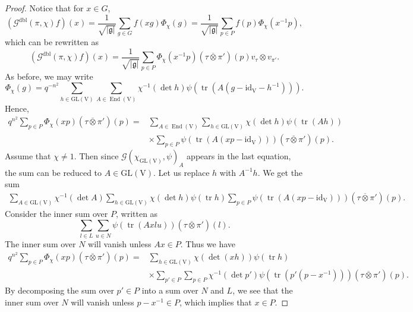 \documentclass[12pt, reqno]{amsart}
\theoremstyle{definition}
\theoremstyle{definition}
\theoremstyle{definition}
\newcommand{\EndomorphismRing}{\operatorname{End}}
\newcommand{\idmap}{\mathrm{id}}
\newcommand{\sizeof}[1]{\left|#1\right|}
\newcommand{\hermitianSpace}{\mathrm{V}}
\newcommand{\fieldCharacter}{\psi}
\newcommand{\trace}{\operatorname{tr}}
\newcommand{\GL}{\mathrm{GL}}
\newcommand{\GaussSum}[2]{\mathcal{G}\left(#1, #2\right)}
\newcommand{\dblGaussSum}[2]{\mathcal{G}^{\mathrm{dbl}}\left(#1, #2\right)}
\newcommand{\lieAlgebra}{\mathfrak{g}}
\begin{document}
\begin{proof}
	Notice that for $x \in G$, $$\left(\dblGaussSum{\pi}{\chi} f\right)\left(x\right) = \frac{1}{\sqrt{\sizeof{\lieAlgebra}}} \sum_{g \in G} f\left(xg\right) \Phi_{\chi}\left(g\right) = \frac{1}{\sqrt{\sizeof{\lieAlgebra}}} \sum_{p \in P} f\left(p\right) \Phi_{\chi}\left(x^{-1} p\right),$$
	which can be rewritten as
	$$\left(\dblGaussSum{\pi}{\chi} f\right)\left(x\right) = \frac{1}{\sqrt{\sizeof{\lieAlgebra}}} \sum_{p \in P}  \Phi_{\chi}\left(x^{-1} p\right) \left(\tau \overline{\otimes} \pi'\right)\left(p\right) v_\tau \otimes v_{\pi'}.$$
	As before, we may write
	$$\Phi_{\chi}\left(g\right) = q^{-n^2} \sum_{h \in \GL\left(\hermitianSpace\right)} \sum_{A \in \EndomorphismRing\left(\hermitianSpace\right)} \chi^{-1}\left(\det h\right) \fieldCharacter\left(\trace\left(A \left(g - \idmap_{\hermitianSpace} - h^{-1}\right)\right)\right).$$
	Hence, \begin{align*}
		q^{n^2} \sum_{p \in P} \Phi_{\chi}\left(xp\right) \left(\tau \overline{\otimes} \pi'\right)\left(p\right) =& \sum_{A \in \EndomorphismRing\left(\hermitianSpace\right)} \sum_{h \in \GL\left(\hermitianSpace\right)} \chi\left(\det h\right)\fieldCharacter\left(\trace\left(Ah\right)\right) \\
		& \times \sum_{p \in P} \fieldCharacter\left(\trace\left(A \left(xp - \idmap_{\hermitianSpace}\right)\right)\right) \left(\tau \overline{\otimes} \pi'\right)\left(p\right).
	\end{align*}
	Assume that $\chi \ne 1$. Then since $\GaussSum{\chi_{\GL\left(\hermitianSpace\right)}}{\fieldCharacter}_A$ appears in the last equation, the sum can be reduced to $A \in \GL\left(\hermitianSpace\right)$. Let us replace $h$ with $A^{-1} h$. We get the sum
	\begin{align*}
		\sum_{A \in \GL\left(\hermitianSpace\right)} \chi^{-1}\left(\det A\right) \sum_{h \in \GL\left(\hermitianSpace\right)} \chi\left(\det h\right)\fieldCharacter\left(\trace h\right) \sum_{p \in P} \fieldCharacter\left(\trace\left(A \left(xp - \idmap_{\hermitianSpace}\right)\right)\right) \left(\tau \overline{\otimes} \pi'\right)\left(p\right).
	\end{align*}
	Consider the inner sum over $P$, written as $$\sum_{l \in L} \sum_{u \in N} \fieldCharacter\left(\trace\left(A x l u\right)\right) \left(\tau \overline{\otimes} \pi'\right)\left(l\right).$$
	The inner sum over $N$ will vanish unless $Ax \in P$. Thus we have
	\begin{align*}
		q^{n^2} \sum_{p \in P} \Phi_{\chi}\left(xp\right) \left(\tau \overline{\otimes} \pi'\right)\left(p\right) =& \sum_{h \in \GL\left(\hermitianSpace\right)}  \chi\left(\det\left(xh\right)\right) \fieldCharacter\left(\trace h\right) \\
		& \times \sum_{p' \in P} \sum_{p \in P} \chi^{-1}\left(\det p'\right) \fieldCharacter\left(\trace\left(p' \left(p - x^{-1}\right)\right)\right) \left(\tau \overline{\otimes} \pi'\right)\left(p\right).
	\end{align*}
	By decomposing the sum over $p' \in P$ into a sum over $N$ and $L$, we see that the inner sum over $N$ will vanish unless $p - x^{-1} \in P$, which implies that $x \in P$.
	

\end{proof}
\end{document}
